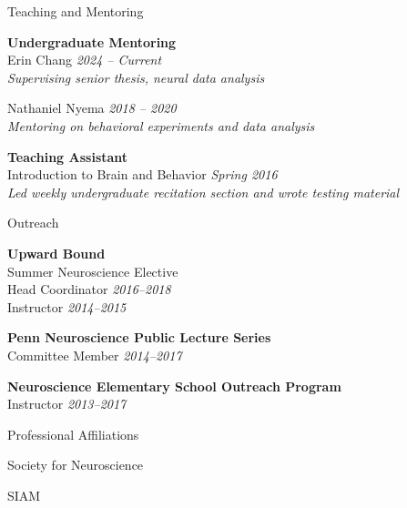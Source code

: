 \documentclass{resume} %
\begin{document}

\begin{rSection}{Teaching and Mentoring}

\textbf{Undergraduate Mentoring} \\
Erin Chang \hfill \emph{2024 -- Current} \\
\emph{Supervising senior thesis, neural data analysis}

Nathaniel Nyema \hfill \emph{2018 -- 2020} \\
\emph{Mentoring on behavioral experiments and data analysis}

\textbf{Teaching Assistant} \\
Introduction to Brain and Behavior \hfill \emph{Spring 2016} \\
\emph{Led weekly undergraduate recitation section and wrote testing material}

\end{rSection}


\begin{rSection}{Outreach}

\textbf{Upward Bound}\\
Summer Neuroscience Elective \\
Head Coordinator \hfill \emph{2016--2018} \\
Instructor \hfill \emph{2014--2015}

\textbf{Penn Neuroscience Public Lecture Series}\\
Committee Member \hfill \emph{2014--2017}

\textbf{Neuroscience Elementary School Outreach Program}\\
Instructor \hfill \emph{2013--2017}

\end{rSection}


\begin{rSection}{Professional Affiliations}

Society for Neuroscience

SIAM

\end{rSection}
\end{document}
